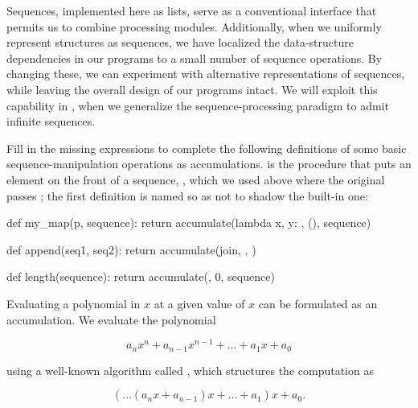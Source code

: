 Sequences, implemented here as lists, serve as a conventional interface that
permits us to combine processing modules.  Additionally, when we uniformly
represent structures as sequences, we have localized the data-structure
dependencies in our programs to a small number of sequence operations.  By
changing these, we can experiment with alternative representations of
sequences, while leaving the overall design of our programs intact.  We will
exploit this capability in , when we generalize the
sequence-processing paradigm to admit infinite sequences.

\begin{exerciseGroup}
\label{Exercise 2.33}
 Fill in the missing expressions
to complete the following definitions of some basic sequence-manipulation
operations as accumulations.   is the procedure that puts an element
on the front of a sequence, , which we used
above where the original passes ; the first definition is named
 so as not to shadow the built-in one:

\begin{syntaxForm}
def my_map(p, sequence):
    return accumulate(lambda x, y: , (), sequence)

def append(seq1, seq2):
    return accumulate(join, , )

def length(sequence):
    return accumulate(, 0, sequence)
\end{syntaxForm}

\label{Exercise 2.34}
 Evaluating a polynomial in \( x \)
at a given value of \( x \) can be formulated as an accumulation.  We evaluate
the polynomial

$$ a_n x^n + a_{n-1} x^{n-1} + \dots + a_1 x + a_0 $$

\noindent
using a well-known algorithm called , which structures
the computation as

$$ (\dots (a_n x + a_{n-1}) x + \dots + a_1) x + a_0. $$


\end{exerciseGroup}
